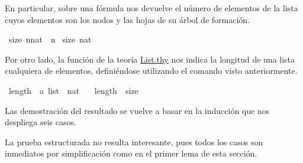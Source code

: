 \begin{isabellebody}
\begin{isamarkuptext}
  En particular, sobre una fórmula nos devuelve el número de elementos 
  de la lista cuyos elementos son los nodos y las hojas de su árbol de 
  formación.%
\end{isamarkuptext}\isamarkuptrue%
\isamarkupfalse%
\ {\isachardoublequoteopen}size\ {\isacharparenleft}n{\isacharcolon}{\isacharcolon}nat{\isacharparenright}\ {\isacharequal}\ n{\isachardoublequoteclose}\isanewline
{}\isamarkupfalse%
\ {\isachardoublequoteopen}size\ {\isacharparenleft}{}{\isacharcolon}{\isacharcolon}nat{\isacharparenright}\ {\isacharequal}\ {}{\isachardoublequoteclose}%
\begin{isamarkuptext}%
Por otro lado, la función  de la teoría 
  \href{http://cort.as/-Stfm}{List.thy} nos indica la longitud de una 
  lista cualquiera de elementos, definiéndose utilizando el comando
   visto anteriormente.%
\end{isamarkuptext}\isamarkuptrue%
\isamarkupfalse%
\ length{\isacharprime}\ {\isacharcolon}{\isacharcolon}\ {\isachardoublequoteopen}{\isacharprime}a\ list\ {\isasymRightarrow}\ nat{\isachardoublequoteclose}\ \isanewline
\ \ {\isachardoublequoteopen}length{\isacharprime}\ {\isasymequiv}\ size{\isachardoublequoteclose}%
\begin{isamarkuptext}%
Las demostración del resultado se vuelve a basar en la inducción 
  que nos despliega seis casos. 

  La prueba estructurada no resulta interesante, pues todos los casos 
  son inmediatos por simplificación como en el primer lema de esta 
  sección. 


\end{isamarkuptext}
\end{isabellebody}
